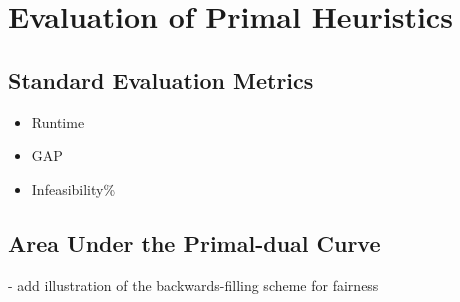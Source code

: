 

\chapter{Evaluation of Primal Heuristics}\label{chap:evaluation}

\section{Standard Evaluation Metrics}

\begin{itemize}
    \item Runtime
    \item GAP
    \item Infeasibility\%
\end{itemize}

\section{Area Under the Primal-dual Curve}

- add illustration of the backwards-filling scheme for fairness

